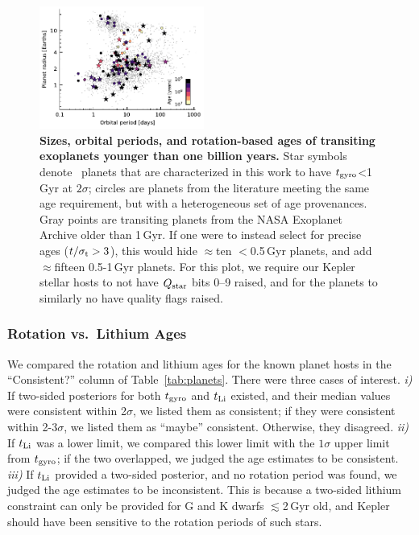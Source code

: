 \documentclass[11pt,twocolumn,tighten,linenumbers,trackchanges]{aastex63}
\begin{document}
\begin{figure}[!t]
  \begin{center}
    \includegraphics[width=0.48\textwidth]{rp_vs_period_scatter_20240415_colorbyage_showaux-gyro_anyyoung_anyyoung.pdf}
  \end{center}
  \vspace{-0.5cm}
  \caption{
    {\bf Sizes, orbital periods, and rotation-based ages of transiting
    exoplanets younger than one billion years.} Star symbols denote
    \nplyounggyrotwosigmanograzingnoruwe\ planets that are
    characterized in this work to have $t_{\rm gyro}$<1\,Gyr at
    $2$$\sigma$; circles are planets from the literature meeting the
    same age requirement, but with a heterogeneous set of age
    provenances.  Gray points are transiting planets from the NASA
    Exoplanet Archive older than 1\,Gyr.  If one were to instead
    select for precise ages ($t/\sigma_{\rm t}>3$), this would hide
    $\approx$ten $<$0.5\,Gyr planets, and add $\approx$fifteen
    0.5-1\,Gyr planets.  For this plot, we require our Kepler stellar
    hosts to not have $Q_{\rm star}$ bits 0--9 raised, and for the
    planets to similarly no have quality flags raised. 
    \label{fig:rp_period_age_results}
  }
\end{figure}


\subsubsection{Rotation vs.~Lithium Ages}
\label{subsec:rotnlithiumcomp}

We compared the rotation and lithium ages for the known planet hosts
in the ``Consistent?'' column of Table~\ref{tab:planets}.  There were
three cases of interest.  {\it i)} If two-sided posteriors for both
$t_{\rm gyro}$ and $t_{\rm Li}$ existed, and their median values were
consistent within 2$\sigma$, we listed them as consistent; if they
were consistent within 2-3$\sigma$, we listed them as ``maybe''
consistent.  Otherwise, they disagreed.  {\it ii)} If $t_{\rm Li}$ was
a lower limit, we compared this lower limit with the $1\sigma$ upper
limit from $t_{\rm gyro}$; if the two overlapped, we judged the age
estimates to be consistent.  {\it iii)} If $t_{\rm Li}$ provided a
two-sided posterior, and no rotation period was found, we judged the
age estimates to be inconsistent.  This is because a two-sided lithium
constraint can only be provided for G and K dwarfs $\lesssim$2\,Gyr
old, and Kepler should have been sensitive to the rotation periods of
such stars.
\end{document}
